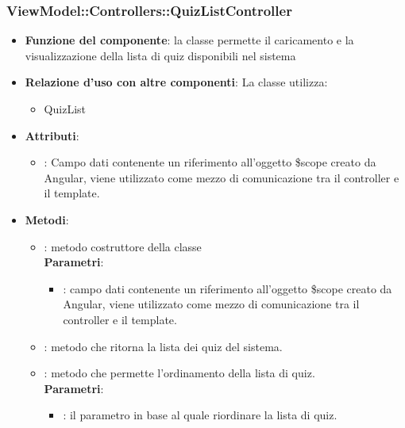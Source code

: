 \subsubsection{ViewModel::Controllers::QuizListController}
\begin{itemize}
\item\textbf{Funzione del componente}:  la classe permette il caricamento e la visualizzazione della lista di quiz disponibili nel sistema
	\item\textbf{Relazione d'uso con altre componenti}:
La classe utilizza:
	\begin{itemize}
		\item QuizList
	\end{itemize}
\item\textbf{Attributi}:
	\begin{itemize}
		\item{}: Campo dati contenente un riferimento all’oggetto \$scope creato da Angular, viene utilizzato come mezzo di comunicazione tra il controller e il template.\\
	\end{itemize}
\item\textbf{Metodi}:
	\begin{itemize}
		\item{}: metodo costruttore della classe\\
		\textbf{Parametri}:
			\begin{itemize}
				\item{}: campo dati contenente un riferimento all’oggetto \$scope creato da Angular, viene utilizzato come mezzo di comunicazione tra il controller e il template.\\
			\end{itemize}
		\item{}: metodo che ritorna la lista dei quiz del sistema.\\		
		\item{}: metodo che permette l'ordinamento della lista di quiz.\\
		\textbf{Parametri}:
			\begin{itemize}
				\item{}: il parametro in base al quale riordinare la lista di quiz.\\
			\end{itemize}
	\end{itemize}
\end{itemize}

